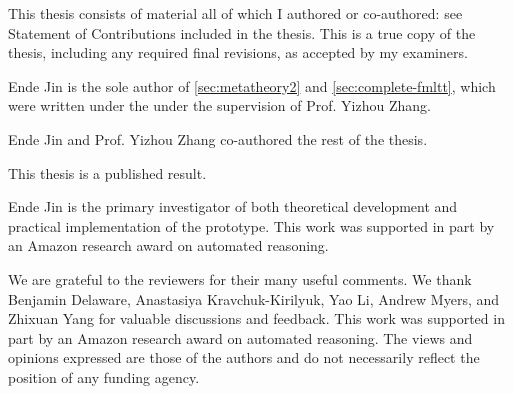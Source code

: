 





\newpage

\setcounter{page}{1}

\vspace*{\fill}


This thesis consists of material all of which I authored or co-authored: see Statement of Contributions included in the thesis. This is a true copy of the thesis, including any required final revisions, as accepted by my examiners.

\vspace*{\fill}

\newpage 


\vspace*{\fill}




Ende Jin is the sole author of \cref{sec:metatheory2} and \cref{sec:complete-fmltt}, which were written under the under the supervision of Prof. Yizhou Zhang.

Ende Jin and Prof. Yizhou Zhang co-authored the rest of the thesis.

This thesis is a published result.

 Ende Jin is the primary investigator of both theoretical development and practical implementation of the prototype. This work was supported in part by an Amazon research award on automated
reasoning.

\vspace*{\fill}

\newpage


\vspace*{\fill}


\vspace*{\fill}


\newpage


\vspace*{\fill}

We are grateful to the reviewers for their many useful comments.  We thank
Benjamin Delaware,
Anastasiya Kravchuk-Kirilyuk, Yao Li, Andrew Myers, and Zhixuan Yang
for valuable discussions and feedback.
This work was supported in part by an Amazon research award on automated
reasoning.
The views and opinions expressed are those of the authors and do not necessarily
reflect the position of any funding agency.

